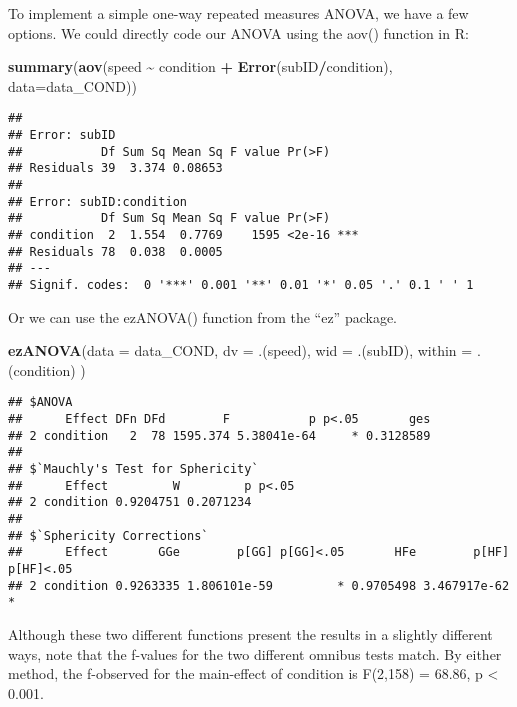 \documentclass[]{article}
\newenvironment{Shaded}{\begin{snugshade}}{\end{snugshade}}
\newcommand{\DataTypeTok}[1]{\textcolor[rgb]{0.13,0.29,0.53}{#1}}
\newcommand{\KeywordTok}[1]{\textcolor[rgb]{0.13,0.29,0.53}{\textbf{#1}}}
\newcommand{\NormalTok}[1]{#1}
\newcommand{\OperatorTok}[1]{\textcolor[rgb]{0.81,0.36,0.00}{\textbf{#1}}}
\newcommand{\StringTok}[1]{\textcolor[rgb]{0.31,0.60,0.02}{#1}}
\begin{document}
To implement a simple one-way repeated measures ANOVA, we have a few
options. We could directly code our ANOVA using the aov() function in R:

\begin{Shaded}
\begin{Highlighting}[]
\KeywordTok{summary}\NormalTok{(}\KeywordTok{aov}\NormalTok{(speed }\OperatorTok{\textasciitilde{}}\StringTok{ }\NormalTok{condition }\OperatorTok{+}\StringTok{ }\KeywordTok{Error}\NormalTok{(subID}\OperatorTok{/}\NormalTok{condition), }\DataTypeTok{data=}\NormalTok{data\_COND))}
\end{Highlighting}
\end{Shaded}

\begin{verbatim}
## 
## Error: subID
##           Df Sum Sq Mean Sq F value Pr(>F)
## Residuals 39  3.374 0.08653               
## 
## Error: subID:condition
##           Df Sum Sq Mean Sq F value Pr(>F)    
## condition  2  1.554  0.7769    1595 <2e-16 ***
## Residuals 78  0.038  0.0005                   
## ---
## Signif. codes:  0 '***' 0.001 '**' 0.01 '*' 0.05 '.' 0.1 ' ' 1
\end{verbatim}

Or we can use the ezANOVA() function from the ``ez'' package.

\begin{Shaded}
\begin{Highlighting}[]
\KeywordTok{ezANOVA}\NormalTok{(}\DataTypeTok{data =}\NormalTok{ data\_COND, }
    \DataTypeTok{dv =}\NormalTok{ .(speed),}
    \DataTypeTok{wid =}\NormalTok{ .(subID),}
    \DataTypeTok{within =}\NormalTok{ .(condition)}
\NormalTok{)}
\end{Highlighting}
\end{Shaded}

\begin{verbatim}
## $ANOVA
##      Effect DFn DFd        F           p p<.05       ges
## 2 condition   2  78 1595.374 5.38041e-64     * 0.3128589
## 
## $`Mauchly's Test for Sphericity`
##      Effect         W         p p<.05
## 2 condition 0.9204751 0.2071234      
## 
## $`Sphericity Corrections`
##      Effect       GGe        p[GG] p[GG]<.05       HFe        p[HF] p[HF]<.05
## 2 condition 0.9263335 1.806101e-59         * 0.9705498 3.467917e-62         *
\end{verbatim}

Although these two different functions present the results in a slightly
different ways, note that the f-values for the two different omnibus
tests match. By either method, the f-observed for the main-effect of
condition is F(2,158) = 68.86, p \textless{} 0.001.
\end{document}
